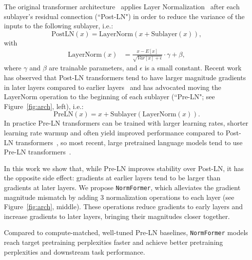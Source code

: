 \documentclass{article} %
\begin{document}
The original transformer architecture~\citep{vaswani2017attention} applies Layer Normalization~\citep{ba2016layer} after each sublayer's residual connection (``Post-LN") in order to reduce the variance of the inputs to the following sublayer, i.e.:
\[
\mathrm{PostLN}(x) = \mathrm{LayerNorm}(x + \mathrm{Sublayer}(x)),
\]
with
\begin{align*}
\mathrm{LayerNorm}(x) &= \frac{x - E[x]}{\sqrt{Var[x] + \epsilon}}\cdot \gamma + \beta,
\label{ln_eqn}
\end{align*}
where $\gamma$ and $\beta$ are trainable parameters, and $\epsilon$ is a small constant.
Recent work has observed that Post-LN transformers tend to have 
larger magnitude gradients in later layers compared to earlier layers~\citep{xiong2020layer} and has advocated moving the LayerNorm operation to the beginning of each sublayer (``Pre-LN"; see Figure~\ref{fig:arch}, left), i.e.:
\[
\mathrm{PreLN}(x) = x + \mathrm{Sublayer}(\mathrm{LayerNorm}(x)).
\]
In practice Pre-LN transformers can be trained with larger learning rates, shorter learning rate warmup and often yield improved performance compared to Post-LN transformers~\citep{xiong2020layer}, so most
recent, large pretrained language models tend to use Pre-LN transformers~\citep{baevski2018adaptive, radford2019language, raffel2020exploring, brown2020gpt3, J1WhitePaper}.

In this work we show that, while Pre-LN improves stability over Post-LN, it has the opposite side effect: gradients at earlier layers tend to be larger than gradients at later layers. We propose \texttt{NormFormer}, which alleviates the gradient magnitude mismatch by adding 3 normalization operations to each layer (see Figure~\ref{fig:arch}, middle). These operations reduce gradients to early layers and increase gradients to later layers, bringing their magnitudes closer together.


Compared to compute-matched, well-tuned Pre-LN baselines, \texttt{NormFormer} models reach target pretraining perplexities faster and achieve better pretraining perplexities and downstream task performance.
\end{document}
